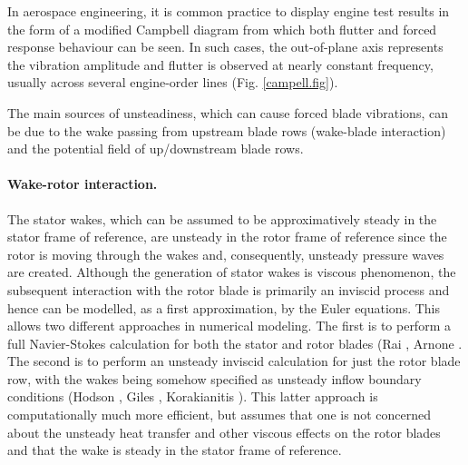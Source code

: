  In aerospace engineering, it is common practice to display
 engine test results in the form of a modified Campbell diagram from
 which both flutter and forced response behaviour can be seen.
 In such cases, the out-of-plane axis represents the vibration
 amplitude and flutter is observed at nearly constant frequency,
 usually across several engine-order lines (Fig. \ref{campell.fig}).

 The main sources of unsteadiness, which can cause forced blade
 vibrations, can be due to the wake passing from upstream blade rows
 (wake-blade interaction) and the potential field of up/downstream
 blade rows.
%
\paragraph{Wake-rotor interaction.}
%
 The stator wakes, which can be
 assumed to be approximatively steady in the stator frame of
 reference, are unsteady in the rotor frame of reference since
 the rotor is moving through the wakes and, consequently, unsteady
 pressure waves are created. Although the generation of stator
 wakes is viscous phenomenon, the subsequent interaction with
 the rotor blade is primarily an inviscid process and hence can
 be modelled, as a first approximation, by the Euler equations.
 This allows two different approaches in numerical modeling.
 The first is to perform a full Navier-Stokes calculation for both the
 stator and rotor blades (Rai ,
 Arnone . The second is to perform an unsteady
 inviscid calculation for just the rotor blade row, with the wakes
 being somehow specified as unsteady inflow boundary conditions
 (Hodson , Giles ,
  Korakianitis ).
 This latter approach is computationally much more efficient,
 but assumes that one is not concerned about the unsteady heat
 transfer and other viscous effects on the rotor blades and that the
 wake is steady in the stator frame of reference.
%
